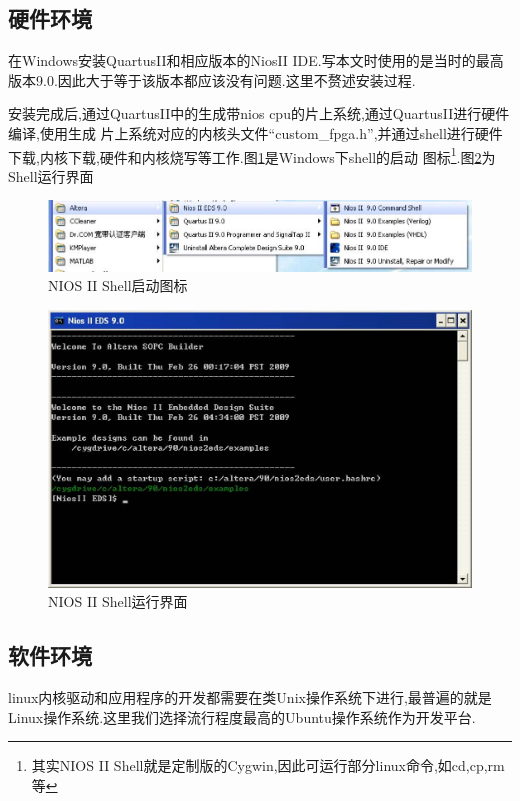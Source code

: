 \documentclass[12pt,a4paper]{article}
\begin{document}
\subsection{硬件环境}
在Windows安装QuartusII和相应版本的NiosII IDE.写本文时使用的是当时的最高版本9.0.因此大于等于该版本都应该没有问题.这里不赘述安装过程.

安装完成后,通过QuartusII中的生成带nios cpu的片上系统,通过QuartusII进行硬件编译,使用生成
片上系统对应的内核头文件``custom\_fpga.h'',并通过shell进行硬件下载,内核下载,硬件和内核烧写等工作.图\ref{fshell}是Windows下shell的启动
图标\footnote{其实NIOS II Shell就是定制版的Cygwin,因此可运行部分linux命令,如cd,cp,rm等}.图\ref{fshellgui}为Shell运行界面\\
\begin{figure}[!htbc]
\centering
\includegraphics[width=1\textwidth]{pic/f_shell_icon.eps}
\caption{NIOS II Shell启动图标\label{fshell}}
\end{figure}
\begin{figure}[!htcb]
\includegraphics[width=1\textwidth]{pic/f_shell.eps}
\caption{NIOS II Shell运行界面\label{fshellgui}}
\end{figure}
\subsection{软件环境}
linux内核驱动和应用程序的开发都需要在类Unix操作系统下进行,最普遍的就是Linux操作系统.这里我们选择流行程度最高的Ubuntu操作系统作为开发平台.
\end{document}
